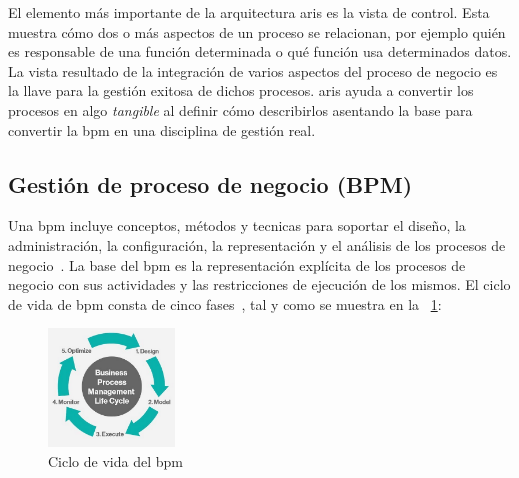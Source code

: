 El elemento más importante de la arquitectura \acrshort{aris} es la vista de control. Esta muestra cómo dos o más aspectos de un proceso se relacionan, por ejemplo quién es responsable de una función determinada o qué función usa determinados datos. La vista resultado de la integración de varios aspectos del proceso de negocio es la llave para la gestión exitosa de dichos procesos. \acrshort{aris} ayuda a convertir los procesos en algo \textit{tangible} al definir cómo describirlos asentando la base para convertir la \acrfull{bpm} en una disciplina de gestión real.


\subsection{Gestión de proceso de negocio (BPM)}

Una \acrshort{bpm} incluye conceptos, métodos y tecnicas para soportar el diseño, la administración, la configuración, la representación y el análisis de los procesos de negocio~\cite{Weske}.
La base del \acrshort{bpm} es la representación explícita de los procesos de negocio con sus actividades y las restricciones de ejecución de los mismos.
El ciclo de vida de \acrshort{bpm} consta de cinco fases~\cite{bpmLifecycle}, tal y como se muestra en la \figurename~\ref{fig:lifecycle-bpm}:

\begin{figure}[hp!]
  \centering
  \includegraphics[width=0.30\textwidth]{imaxes/bpm-lifecycle.png}
  \caption{Ciclo de vida del \acrshort{bpm}}
  \label{fig:lifecycle-bpm}
\end{figure}


